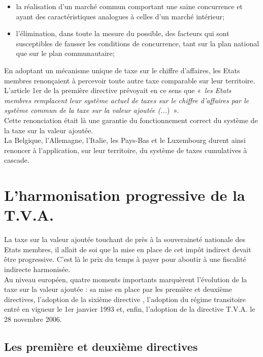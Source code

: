 \documentclass{book}
\begin{document}
\begin{itemize}
\item la réalisation d'un marché commun comportant une saine concurrence et ayant des
caractéristiques analogues à celles d'un marché intérieur;
\item l'élimination, dans toute la mesure du possible, des facteurs qui sont susceptibles
de fausser les conditions de concurrence, tant sur la plan national que sur le plan
communautaire;
\end{itemize}

\null

En adoptant un mécanisme unique de taxe sur le chiffre d'affaires, les Etats membres
renonçaient à percevoir toute autre taxe comparable sur leur territoire. L'article 1er de la
première directive prévoyait en ce sens que «~\textit{les Etats membres remplacent leur système
actuel de taxes sur le chiffre d'affaires par le système commun de la taxe sur la valeur ajoutée
(...})~».\\

Cette renonciation était là une garantie du fonctionnement correct du système de la taxe sur la
valeur ajoutée.\\

La Belgique, l'Allemagne, l'Italie, les Pays-Bas et le Luxembourg durent ainsi renoncer à
l'application, sur leur territoire, du système de taxes cumulatives à cascade.\\

\chapter{L'harmonisation progressive de la T.V.A.}

La taxe sur la valeur ajoutée touchant de près à la souveraineté nationale des Etats membres, il
allait de soi que la mise en place de cet impôt indirect devait être progressive. C'est là le prix
du temps à payer pour aboutir à une fiscalité indirecte harmonisée.\\

Au niveau européen, quatre moments importants marquèrent l'évolution de la taxe sur la
valeur ajoutée : sa mise en place par les première et deuxième directives,
l'adoption de la sixième directive , l'adoption du régime transitoire entré en vigueur
le 1er janvier 1993 et, enfin, l’adoption de la directive T.V.A. le 28 novembre 2006.\\

\section{Les première et deuxième directives}
\end{document}
